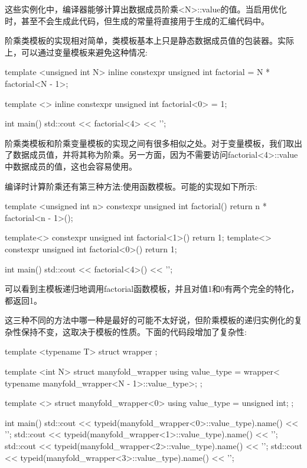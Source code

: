 这些实例化中，编译器能够计算出数据成员阶乘<N>::value的值。当启用优化时，甚至不会生成此代码，但生成的常量将直接用于生成的汇编代码中。

阶乘类模板的实现相对简单，类模板基本上只是静态数据成员值的包装器。实际上，可以通过变量模板来避免这种情况:

\begin{cpp}
template <unsigned int N>
inline constexpr unsigned int factorial = N * factorial<N - 1>;

template <>
inline constexpr unsigned int factorial<0> = 1;

int main()
{
	std::cout << factorial<4> << '\n';
}
\end{cpp}

阶乘类模板和阶乘变量模板的实现之间有很多相似之处。对于变量模板，我们取出了数据成员值，并将其称为阶乘。另一方面，因为不需要访问factorial<4>::value中数据成员的值，这也会容易使用。

编译时计算阶乘还有第三种方法:使用函数模板。可能的实现如下所示:

\begin{cpp}
template <unsigned int n>
constexpr unsigned int factorial()
{
	return n * factorial<n - 1>();
}

template<> constexpr unsigned int factorial<1>() {
												return 1; }
template<> constexpr unsigned int factorial<0>() {
												return 1; }

int main()
{
	std::cout << factorial<4>() << '\n';
}
\end{cpp}

可以看到主模板递归地调用factorial函数模板，并且对值1和0有两个完全的特化，都返回1。

这三种不同的方法中哪一种是最好的可能不太好说，但阶乘模板的递归实例化的复杂性保持不变，这取决于模板的性质。下面的代码段增加了复杂性:

\begin{cpp}
template <typename T>
struct wrapper {};

template <int N>
struct manyfold_wrapper
{
	using value_type =
		wrapper<
			typename manyfold_wrapper<N - 1>::value_type>;
};

template <>
struct manyfold_wrapper<0>
{
	using value_type = unsigned int;
};

int main()
{
	std::cout <<
		typeid(manyfold_wrapper<0>::value_type).name() << '\n';
	std::cout <<
		typeid(manyfold_wrapper<1>::value_type).name() << '\n';
	std::cout <<
		typeid(manyfold_wrapper<2>::value_type).name() << '\n';
	std::cout <<
		typeid(manyfold_wrapper<3>::value_type).name() << '\n';
}
\end{cpp}

